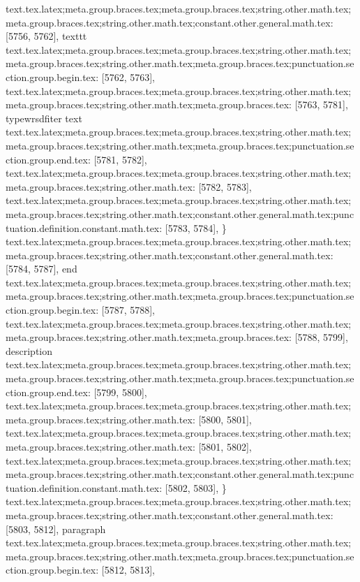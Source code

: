 {{{{{{{{{{{{{{{{{{{{{{{{{{{{{{{{{{{{{{{{{{{{{{{{{{{{{{{{{{{{{{{{{{{{{{{{{{{{{{{{{{{{{{{{{{{{{{{{{{{{{{{{{{{{{{{{{{{{{{{{{{{{{{{{{{{{{{{{{{{{{{{{{{{{{{{{{{{{{{{text.tex.latex;meta.group.braces.tex;meta.group.braces.tex;string.other.math.tex;meta.group.braces.tex;string.other.math.tex;constant.other.general.math.tex: [5756, 5762], {texttt}
text.tex.latex;meta.group.braces.tex;meta.group.braces.tex;string.other.math.tex;meta.group.braces.tex;string.other.math.tex;meta.group.braces.tex;punctuation.section.group.begin.tex: [5762, 5763], {{}
text.tex.latex;meta.group.braces.tex;meta.group.braces.tex;string.other.math.tex;meta.group.braces.tex;string.other.math.tex;meta.group.braces.tex: [5763, 5781], {typewrsdfiter text}
text.tex.latex;meta.group.braces.tex;meta.group.braces.tex;string.other.math.tex;meta.group.braces.tex;string.other.math.tex;meta.group.braces.tex;punctuation.section.group.end.tex: [5781, 5782], {}}
text.tex.latex;meta.group.braces.tex;meta.group.braces.tex;string.other.math.tex;meta.group.braces.tex;string.other.math.tex: [5782, 5783], {
}
text.tex.latex;meta.group.braces.tex;meta.group.braces.tex;string.other.math.tex;meta.group.braces.tex;string.other.math.tex;constant.other.general.math.tex;punctuation.definition.constant.math.tex: [5783, 5784], {\}
text.tex.latex;meta.group.braces.tex;meta.group.braces.tex;string.other.math.tex;meta.group.braces.tex;string.other.math.tex;constant.other.general.math.tex: [5784, 5787], {end}
text.tex.latex;meta.group.braces.tex;meta.group.braces.tex;string.other.math.tex;meta.group.braces.tex;string.other.math.tex;meta.group.braces.tex;punctuation.section.group.begin.tex: [5787, 5788], {{}
text.tex.latex;meta.group.braces.tex;meta.group.braces.tex;string.other.math.tex;meta.group.braces.tex;string.other.math.tex;meta.group.braces.tex: [5788, 5799], {description}
text.tex.latex;meta.group.braces.tex;meta.group.braces.tex;string.other.math.tex;meta.group.braces.tex;string.other.math.tex;meta.group.braces.tex;punctuation.section.group.end.tex: [5799, 5800], {}}
text.tex.latex;meta.group.braces.tex;meta.group.braces.tex;string.other.math.tex;meta.group.braces.tex;string.other.math.tex: [5800, 5801], {
}
text.tex.latex;meta.group.braces.tex;meta.group.braces.tex;string.other.math.tex;meta.group.braces.tex;string.other.math.tex: [5801, 5802], {
}
text.tex.latex;meta.group.braces.tex;meta.group.braces.tex;string.other.math.tex;meta.group.braces.tex;string.other.math.tex;constant.other.general.math.tex;punctuation.definition.constant.math.tex: [5802, 5803], {\}
text.tex.latex;meta.group.braces.tex;meta.group.braces.tex;string.other.math.tex;meta.group.braces.tex;string.other.math.tex;constant.other.general.math.tex: [5803, 5812], {paragraph}
text.tex.latex;meta.group.braces.tex;meta.group.braces.tex;string.other.math.tex;meta.group.braces.tex;string.other.math.tex;meta.group.braces.tex;punctuation.section.group.begin.tex: [5812, 5813], {{}
}}}}}}}}}}}}}}}}}}}}}}}}}}}}}}}}}}}}}}}}}}}}}}}}}}}}}}}}}}}}}}}}}}}}}}}}}}}}}}}}}}}}}}}}}}}}}}}}}}}}}}}}}}}}}}}}}}}}}}}}}}}}}}}}}}}}}}}}}}}}}}}}}}}}}}}}}}}}}}}}}}
